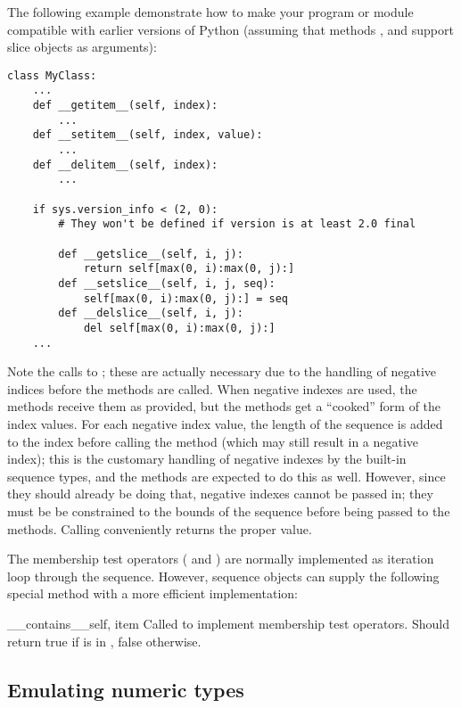 The following example demonstrate how to make your program or module
compatible with earlier versions of Python (assuming that methods
,  and 
support slice objects as arguments):

\begin{verbatim}
class MyClass:
    ...
    def __getitem__(self, index):
        ...
    def __setitem__(self, index, value):
        ...
    def __delitem__(self, index):
        ...

    if sys.version_info < (2, 0):
        # They won't be defined if version is at least 2.0 final

        def __getslice__(self, i, j):
            return self[max(0, i):max(0, j):]
        def __setslice__(self, i, j, seq):
            self[max(0, i):max(0, j):] = seq
        def __delslice__(self, i, j):
            del self[max(0, i):max(0, j):]
    ...
\end{verbatim}

Note the calls to ; these are actually necessary due
to the handling of negative indices before the
 methods are called.  When negative indexes are
used, the  methods receive them as provided, but
the  methods get a ``cooked'' form of the index
values.  For each negative index value, the length of the sequence is
added to the index before calling the method (which may still result
in a negative index); this is the customary handling of negative
indexes by the built-in sequence types, and the 
methods are expected to do this as well.  However, since they should
already be doing that, negative indexes cannot be passed in; they must
be be constrained to the bounds of the sequence before being passed to
the  methods.
Calling  conveniently returns the proper value.

The membership test operators ( and ) are
normally implemented as iteration loop through the sequence.  However,
sequence objects can supply the following special method with a more
efficient implementation:

\begin{methoddesc}{__contains__}{self, item}
Called to implement membership test operators.  Should return true if
 is in , false otherwise.
\end{methoddesc}


\subsection{Emulating numeric types\label{numeric-types}}

